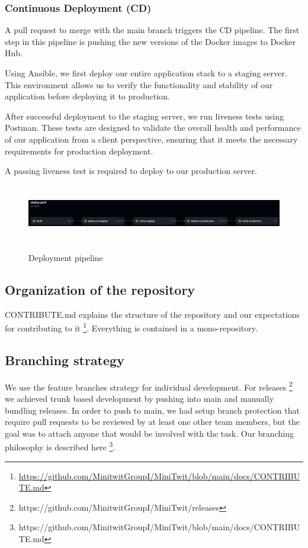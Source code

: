 \documentclass{article}
\begin{document}
\subsubsection{Continuous Deployment (CD)}

A pull request to merge with the main branch triggers the CD pipeline. The first step in this pipeline is pushing the new versions of the Docker images to Docker Hub. 

Using Ansible, we first deploy our entire application stack to a staging server. This environment allows us to verify the functionality and stability of our application before deploying it to production.

After successful deployment to the staging server, we run liveness tests using Postman. These tests are designed to validate the overall health and performance of our application from a client perspective, ensuring that it meets the necessary requirements for production deployment. 

A passing liveness test is required to deploy to our production server. 

\begin{figure}[h]
    \includegraphics[width=1\textwidth, height=2.5cm]{images/Deploy_Pipeline.png}
    \label{fig:cd_pipeline}
    \caption{Deployment pipeline}
    \centering
\end{figure}

\subsection{Organization of the repository}

CONTRIBUTE.md explains the structure of the repository and our expectations for contributing to it \footnote{\url{https://github.com/MinitwitGroupI/MiniTwit/blob/main/docs/CONTRIBUTE.md}}. Everything is contained in a mono-repository.

\subsection{Branching strategy}

We use the feature branches strategy for individual development. For releases \footnote{https://github.com/MinitwitGroupI/MiniTwit/releases} we achieved trunk based development by pushing into main and manually bundling releases. In order to push to main, we had setup branch protection that require pull requests to be reviewed by at least one other team members, but the goal was to attach anyone that would be involved with the task. Our branching philosophy is described here \footnote{https://github.com/MinitwitGroupI/MiniTwit/blob/main/docs/CONTRIBUTE.md}.
\end{document}
